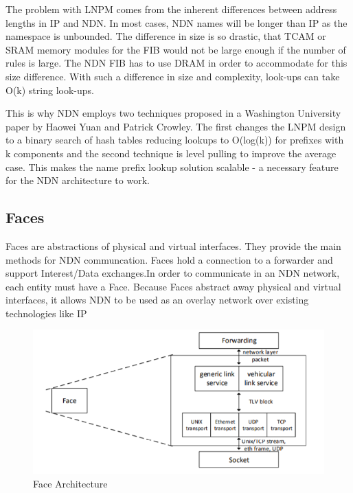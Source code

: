 The problem with LNPM comes from the inherent differences between address lengths in IP and NDN. In most cases, NDN names will be longer than IP as the namespace is unbounded. The difference in size is so drastic, that TCAM or SRAM memory modules for the FIB would not be large enough if the number of rules is large. The NDN FIB has to use DRAM in order to accommodate for this size difference. With such a difference in size and complexity, look-ups can take O(k) string look-ups\cite{021}.\par 
This is why NDN employs two techniques proposed in a Washington University paper by Haowei Yuan and Patrick Crowley. The first changes the LNPM design to a binary search of hash tables reducing lookups to O(log(k)) for prefixes with k components \cite{022} and the second technique is level pulling to improve the average case. This makes the name prefix lookup solution scalable - a necessary feature for the NDN architecture to work. 

\subsection{Faces}
Faces are abstractions of physical and virtual interfaces\cite{023}. They provide the main methods for NDN communcation. Faces hold a connection to a forwarder and support Interest/Data exchanges\cite{024}.In order to communicate in an NDN network, each entity must have a Face. Because Faces abstract away physical and virtual interfaces, it allows NDN to be used as an overlay network over existing technologies like IP\cite{025}
\begin{figure}[ht]
\centering
\includegraphics[scale=0.5]{facearch.png}
\caption{Face Architecture\cite{026}}
\end{figure}
